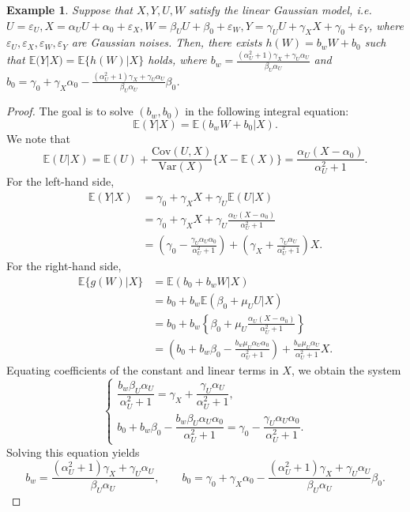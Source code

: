 \documentclass[
  12pt]{article}
\newtheorem{example}{Example}
\begin{document}
\begin{example}\label{example:linear_gaussian}
Suppose that $X, Y, U, W$ satisfy the linear Gaussian model, \emph{i.e.} $U=\varepsilon_U,X =\alpha_U U + \alpha_0+\varepsilon_X,W =\beta_U U +\beta_0 + \varepsilon_W, Y=\gamma_U U + \gamma_X X + \gamma_0 +\varepsilon_Y$, 
where $\varepsilon_U,\varepsilon_X,\varepsilon_W,\varepsilon_Y$ are Gaussian noises. Then, there exists $h(W)=b_w W+b_0$ such that $\mathbb{E}(Y|X)=\mathbb{E}\{h(W)|X\}$ holds, where $b_w = \frac{(\alpha_U^2+1)\gamma_X+\gamma_U\alpha_U}{\beta_U\alpha_U}$ and $b_0 = \gamma_0+\gamma_X\alpha_0-\frac{(\alpha_U^2+1)\gamma_X+\gamma_U\alpha_U}{\beta_U\alpha_U}\beta_0$. 
\end{example}
\begin{proof}
The goal is to solve $(b_w,b_0)$ in the following integral equation:
$$
\mathbb{E}(Y |X) =\mathbb{E}(b_w W+b_0|X).
$$
We note that
$$
\mathbb{E}(U|X)=\mathbb{E}(U)+\frac{\mathrm{Cov}(U,X)}{\mathrm{Var}(X)}\{X-\mathbb{E}(X)\}=\frac{\alpha_U(X-\alpha_0)}{\alpha_U^2+1}.
$$
For the left-hand side,
\begin{align*}
	\mathbb{E} (Y|X)&=\gamma _0+\gamma _XX+\gamma _U\mathbb{E} (U|X)\\
	&=\gamma _0+\gamma _XX+\gamma _U\frac{\alpha _U(X-\alpha _0)}{\alpha _{U}^{2}+1}\\
	&=\left( \gamma _0-\frac{\gamma _U\alpha _U\alpha _0}{\alpha _{U}^{2}+1} \right) +\left( \gamma _X+\frac{\gamma _U\alpha _U}{\alpha _{U}^{2}+1} \right) X.
\end{align*}
For the right-hand side, 
\begin{align*}
	\mathbb{E} \{g(W)|X\}&=\mathbb{E} (b_0+b_wW|X)\\
	&=b_0+b_w\mathbb{E} (\beta _0+\mu _UU|X)\\
	&=b_0+b_w\left\{ \beta _0+\mu _U\frac{\alpha _U(X-\alpha _0)}{\alpha _{U}^{2}+1} \right\}\\
	&=\left( b_0+b_w\beta _0-\frac{b_w\mu _U\alpha _U\alpha _0}{\alpha _{U}^{2}+1} \right) +\frac{b_w\mu _U\alpha _U}{\alpha _{U}^{2}+1}X.
\end{align*}
Equating coefficients of the constant and linear terms in $X$, we obtain the system
$$
\begin{cases}
\dfrac{b_w\beta_U\alpha_U}{\alpha_U^2+1}
= \gamma_X+\dfrac{\gamma_U\alpha_U}{\alpha_U^2+1}, \\[1.2ex]
b_0+b_w\beta_0-\dfrac{b_w\beta_U\alpha_U\alpha_0}{\alpha_U^2+1}
=\gamma_0-\dfrac{\gamma_U\alpha_U\alpha_0}{\alpha_U^2+1}.
\end{cases}
$$
Solving this equation yields
$$
b_w=\frac{(\alpha_U^2+1)\gamma_X+\gamma_U\alpha_U}{\beta_U\alpha_U},\qquad
b_0=\gamma_0+\gamma_X\alpha_0-\frac{(\alpha_U^2+1)\gamma_X+\gamma_U\alpha_U}{\beta_U\alpha_U}\beta_0.
$$
\end{proof}
\end{document}
